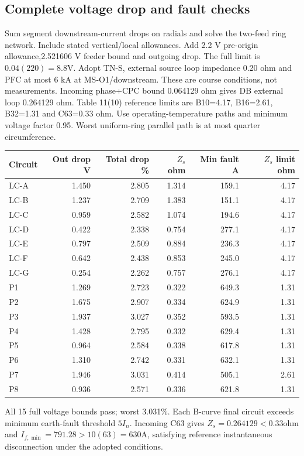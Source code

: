 \documentclass[11pt]{article}
\begin{document}
\subsection*{Complete voltage drop and fault checks}
Sum segment downstream-current drops on radials and solve the two-feed ring network. Include stated vertical/local allowances. Add 2.2 V pre-origin allowance,2.521606 V feeder bound and outgoing drop. The full limit is $0.04(220)=8.8$V.
Adopt TN-S, external source loop impedance 0.20 ohm and PFC at most 6 kA at MS-O1/downstream. These are course conditions, not measurements. Incoming phase+CPC bound 0.064129 ohm gives DB external loop 0.264129 ohm. Table 11(10) reference limits are B10=4.17, B16=2.61, B32=1.31 and C63=0.33 ohm. Use operating-temperature paths and minimum voltage factor 0.95. Worst uniform-ring parallel path is at most quarter circumference.
\begin{longtable}{lrrrrr}\toprule
Circuit & Out drop V & Total drop \% & $Z_s$ ohm & Min fault A & $Z_s$ limit ohm\\\midrule\endhead

LC-A & 1.450 & 2.805 & 1.314 & 159.1 & 4.17 \\
LC-B & 1.237 & 2.709 & 1.383 & 151.1 & 4.17 \\
LC-C & 0.959 & 2.582 & 1.074 & 194.6 & 4.17 \\
LC-D & 0.422 & 2.338 & 0.754 & 277.1 & 4.17 \\
LC-E & 0.797 & 2.509 & 0.884 & 236.3 & 4.17 \\
LC-F & 0.642 & 2.438 & 0.853 & 245.0 & 4.17 \\
LC-G & 0.254 & 2.262 & 0.757 & 276.1 & 4.17 \\
P1 & 1.269 & 2.723 & 0.322 & 649.3 & 1.31 \\
P2 & 1.675 & 2.907 & 0.334 & 624.9 & 1.31 \\
P3 & 1.937 & 3.027 & 0.352 & 593.5 & 1.31 \\
P4 & 1.428 & 2.795 & 0.332 & 629.4 & 1.31 \\
P5 & 0.964 & 2.584 & 0.338 & 617.8 & 1.31 \\
P6 & 1.310 & 2.742 & 0.331 & 632.1 & 1.31 \\
P7 & 1.946 & 3.031 & 0.414 & 505.1 & 2.61 \\
P8 & 0.936 & 2.571 & 0.336 & 621.8 & 1.31 \\

\bottomrule\end{longtable}
All 15 full voltage bounds pass;  worst 3.031\%. Each B-curve final circuit exceeds minimum earth-fault threshold $5I_n$. Incoming C63 gives $Z_s=0.264129<0.33$ohm and $I_{f,\min}=791.28>10(63)=630$A, satisfying reference instantaneous disconnection under the adopted conditions.
\end{document}
